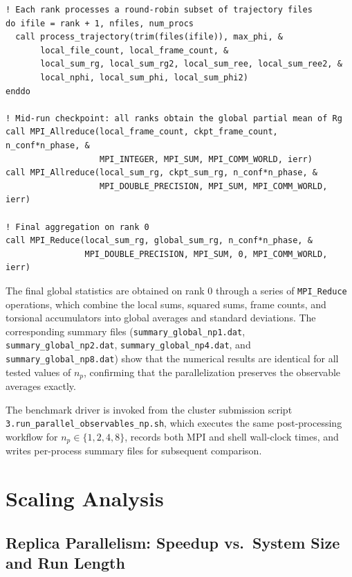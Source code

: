 \documentclass[11pt, a4paper]{article}
\begin{document}
\begin{lstlisting}[caption={Round-robin file distribution and MPI checkpoint in \texttt{main\_parallel\_observables.f90}.}]
! Each rank processes a round-robin subset of trajectory files
do ifile = rank + 1, nfiles, num_procs
  call process_trajectory(trim(files(ifile)), max_phi, &
       local_file_count, local_frame_count, &
       local_sum_rg, local_sum_rg2, local_sum_ree, local_sum_ree2, &
       local_nphi, local_sum_phi, local_sum_phi2)
enddo

! Mid-run checkpoint: all ranks obtain the global partial mean of Rg
call MPI_Allreduce(local_frame_count, ckpt_frame_count, n_conf*n_phase, &
                   MPI_INTEGER, MPI_SUM, MPI_COMM_WORLD, ierr)
call MPI_Allreduce(local_sum_rg, ckpt_sum_rg, n_conf*n_phase, &
                   MPI_DOUBLE_PRECISION, MPI_SUM, MPI_COMM_WORLD, ierr)

! Final aggregation on rank 0
call MPI_Reduce(local_sum_rg, global_sum_rg, n_conf*n_phase, &
                MPI_DOUBLE_PRECISION, MPI_SUM, 0, MPI_COMM_WORLD, ierr)
\end{lstlisting}

The final global statistics are obtained on rank 0 through a series of
\texttt{MPI\_Reduce} operations, which combine the local sums, squared sums,
frame counts, and torsional accumulators into global averages and standard
deviations. The corresponding summary files
(\texttt{summary\_global\_np1.dat}, \texttt{summary\_global\_np2.dat},
\texttt{summary\_global\_np4.dat}, and \texttt{summary\_global\_np8.dat}) show
that the numerical results are identical for all tested values of \(n_p\),
confirming that the parallelization preserves the observable averages exactly.

The benchmark driver is invoked from the cluster submission script
\texttt{3.run\_parallel\_observables\_np.sh}, which executes the same
post-processing workflow for \(n_p \in \{1,2,4,8\}\), records both MPI and
shell wall-clock times, and writes per-process summary files for subsequent
comparison.

\section{Scaling Analysis}
\label{sec:scaling}

\subsection{Replica Parallelism: Speedup vs.\ System Size and Run Length}
\end{document}

